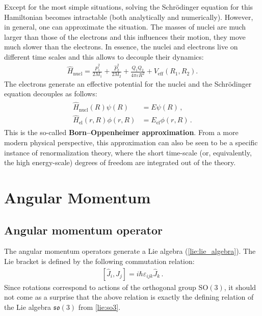     Except for the most simple situations, solving the Schr\"odinger equation for this Hamiltonian becomes intractable (both analytically and numerically). However, in general, one can approximate the situation. The masses of nuclei are much larger than those of the electrons and this influences their motion, they move much slower than the electrons. In essence, the nuclei and electrons live on different time scales and this allows to decouple their dynamics:
    \begin{gather}
        \widehat{H}_{\text{nucl}} = \frac{\widehat{P}_1^2}{2M_1} + \frac{\widehat{P}_2^2}{2M_2} + \frac{Q_1Q_2}{4\pi\varepsilon R^2} + V_{\text{eff}}(R_1,R_2).
    \end{gather}
    The electrons generate an effective potential for the nuclei and the Schr\"odinger equation decouples as follows:
    \begin{gather}
        \begin{aligned}
            \widehat{H}_{\text{nucl}}(R)\psi(R) &= E\psi(R)\,,\\
            \widehat{H}_{\text{el}}(r,R)\phi(r,R) &= E_{\text{el}}\phi(r,R)\,.
        \end{aligned}
    \end{gather}
    This is the so-called \textbf{Born--Oppenheimer approximation}. From a more modern physical perspective, this approximation can also be seen to be a specific instance of renormalization theory, where the short time-scale (or, equivalently, the high energy-scale) degrees of freedom are integrated out of the theory.

\section{Angular Momentum}
\subsection{Angular momentum operator}

    \begin{property}
       The angular momentum operators generate a Lie algebra (\cref{lie:lie_algebra}). The Lie bracket is defined by the following commutation relation:
       \begin{gather}
           \label{angular_momentum:commutation}
           \left[\widehat{J}_i,\widehat{J}_j\right] = i\hbar\varepsilon_{ijk}\widehat{J}_k\,.
       \end{gather}
       Since rotations correspond to actions of the orthogonal group $\mathrm{SO}(3)$, it should not come as a surprise that the above relation is exactly the defining relation of the Lie algebra $\mathfrak{so}(3)$ from \cref{lie:so3}.
    \end{property}

